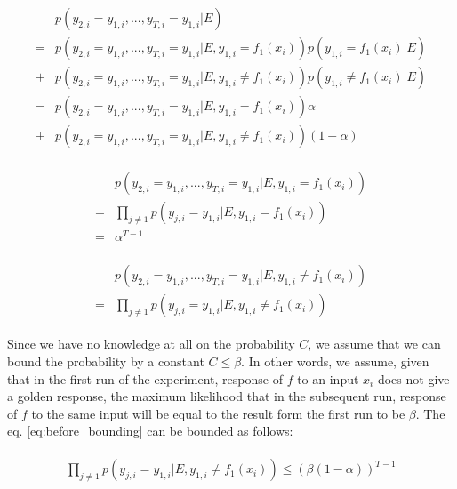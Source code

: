 \documentclass[]{article}
\begin{document}
\begin{align}
    \begin{split}
     &p(y_{2, i} = y_{1, i}, ... , y_{T, i} = y_{1, i}| E) 
     \\=&p(y_{2, i} = y_{1, i}, ... , y_{T, i} = y_{1, i}| E, y_{1, 
     i} = f_1(x_i))p(y_{1, i} = f_1(x_i)| E)  
     \\+&p(y_{2, i} = y_{1, i}, ... , y_{T, i} = y_{1, i}| E, y_{1, 
         i} \neq f_1(x_i))p(y_{1, i} \neq f_1(x_i)| E)
     \\=&p(y_{2, i} = y_{1, i}, ... , y_{T, i} = y_{1, i}| E, y_{1, 
         i} = f_1(x_i))\alpha 
     \\+&p(y_{2, i} = y_{1, i}, ... , y_{T, i} = y_{1, i}|E, y_{1, 
     i} \neq f_1(x_i))(1 - \alpha)
    \end{split}
\end{align}

\begin{align}
    \begin{split}
    &p(y_{2, i} = y_{1, i}, ... , y_{T, i} = y_{1, i}| E, y_{1, i}=f_1(x_i))
    \\ =& \prod_{j\neq 1}p(y_{j, i} = y_{1, i}| E, y_{1, i}=f_1(x_i)) 
    \\=&\alpha^{T-1}
    \end{split}
\end{align}

\begin{align}
\label{eq:before_bounding}
    \begin{split}
    &p(y_{2, i} = y_{1, i}, ... , y_{T, i} = y_{1, i}| E, y_{1, i}\neq 
    f_1(x_i))
    \\=&\prod_{j\neq 1}p(y_{j, i} = y_{1, i}| E, y_{1, i}\neq f_1(x_i))
    \end{split}
\end{align}

Since we have no knowledge at all on the probability $C$, we assume that we can 
bound the probability by a constant $C\leq\beta$. In other words, we assume, 
given that in the first run of the experiment, response of $f$ to an input 
$x_i$ does not give a golden response, the maximum likelihood that in the 
subsequent run, response of $f$ to the same input will be equal to the result 
form the first run to be $\beta$. 
The eq. \ref{eq:before_bounding} can be bounded as follows:

\begin{align}
    \begin{split}
    \prod_{j\neq 1}p(y_{j, i} = y_{1, i}| E, y_{1, i}\neq f_1(x_i)) \leq  
    (\beta(1-\alpha))^{T-1}
    \end{split}
\end{align} 
\end{document}
